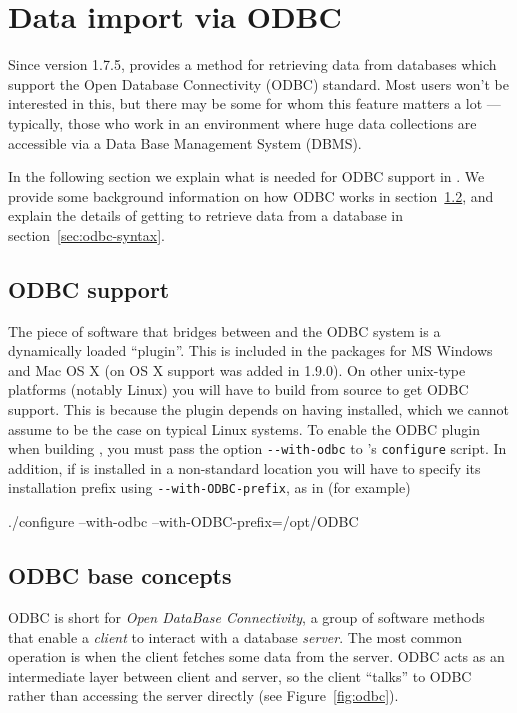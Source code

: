 \chapter{Data import via ODBC}
\label{chap:odbc}

Since version 1.7.5,  provides a method for retrieving data
from databases which support the Open Database Connectivity (ODBC)
standard. Most users won't be interested in this, but there may be
some for whom this feature matters a lot --- typically, those who work
in an environment where huge data collections are accessible via a
Data Base Management System (DBMS).

In the following section we explain what is needed for ODBC support in
. We provide some background information on how ODBC works
in section~\ref{sec:odbc-base}, and explain the details of getting
 to retrieve data from a database in
section~\ref{sec:odbc-syntax}.

\section{ODBC support}
\label{sec:odbc-support}

The piece of software that bridges between  and the ODBC
system is a dynamically loaded ``plugin''. This is included in the
 packages for MS Windows and Mac OS X (on OS X support was
added in  1.9.0). On other unix-type platforms (notably
Linux) you will have to build  from source to get ODBC
support.  This is because the  plugin depends on
having  installed, which we cannot assume to be the
case on typical Linux systems. To enable the ODBC plugin when building 
, you must pass the option \verb|--with-odbc| to
's \texttt{configure} script. In addition, if
 is installed in a non-standard location you will have
to specify its installation prefix using \verb|--with-ODBC-prefix|,
as in (for example)
\begin{code}
  ./configure --with-odbc --with-ODBC-prefix=/opt/ODBC
\end{code}

\section{ODBC base concepts}
\label{sec:odbc-base}

ODBC is short for \emph{Open DataBase Connectivity}, a group of
software methods that enable a \emph{client} to interact with a
database \emph{server}. The most common operation is when the client
fetches some data from the server. ODBC acts as an intermediate layer
between client and server, so the client ``talks'' to ODBC rather than
accessing the server directly (see Figure~\ref{fig:odbc}).

